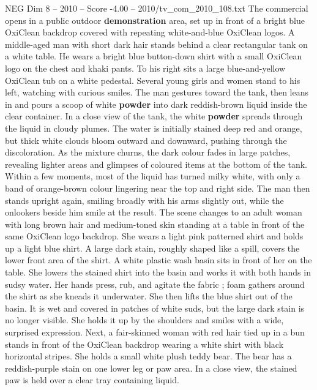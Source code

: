 \begin{textsample}{NEG Dim 8 – 2010 – Score -4.00 – 2010/tv\_com\_2010\_108.txt}  \label{ex:f8_neg_071}
The commercial opens in a public outdoor \textbf{demonstration} area, set up in front of a bright blue OxiClean backdrop covered with repeating white-and-blue OxiClean logos.
A middle-aged man with short dark hair stands behind a clear rectangular tank on a white table.
He wears a bright blue button-down shirt with a small OxiClean logo on the chest and khaki pants.
To his right sits a large blue-and-yellow OxiClean tub on a white pedestal.
Several young girls and women stand to his left, watching with curious smiles.
The man gestures toward the tank, then leans in and pours a scoop of white \textbf{powder} into dark reddish-brown liquid inside the clear container.
In a close view of the tank, the white \textbf{powder} spreads through the liquid in cloudy plumes.
The water is initially stained deep red and orange, but thick white clouds bloom outward and downward, pushing through the discoloration.
As the mixture churns, the dark colour fades in large patches, revealing lighter areas and glimpses of coloured items at the bottom of the tank.
Within a few moments, most of the liquid has turned milky white, with only a band of orange-brown colour lingering near the top and right side.
The man then stands upright again, smiling broadly with his arms slightly out, while the onlookers beside him smile at the result.
The scene changes to an adult woman with long brown hair and medium-toned skin standing at a table in front of the same OxiClean logo backdrop.
She wears a light pink patterned shirt and holds up a light blue shirt.
A large dark stain, roughly shaped like a spill, covers the lower front area of the shirt.
A white plastic wash basin sits in front of her on the table.
She lowers the stained shirt into the basin and works it with both hands in sudsy water.
Her hands press, rub, and agitate the fabric ; foam gathers around the shirt as she kneads it underwater.
She then lifts the blue shirt out of the basin.
It is wet and covered in patches of white suds, but the large dark stain is no longer visible.
She holds it up by the shoulders and smiles with a wide, surprised expression.
Next, a fair-skinned woman with red hair tied up in a bun stands in front of the OxiClean backdrop wearing a white shirt with black horizontal stripes.
She holds a small white plush teddy bear.
The bear has a reddish-purple stain on one lower leg or paw area.
In a close view, the stained paw is held over a clear tray containing liquid.

\end{textsample}
